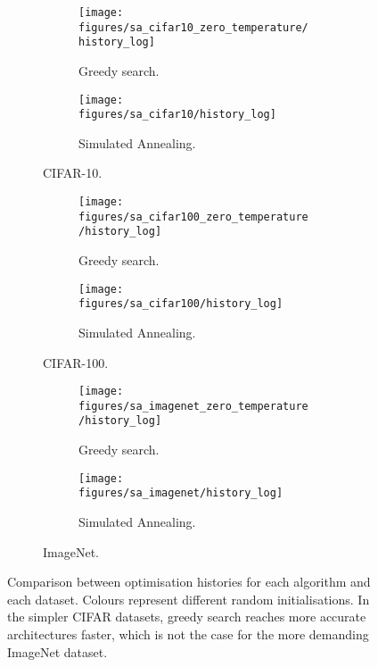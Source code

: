\documentclass{article}
\begin{document}
\begin{figure}[htbp]
    \begin{subfigure}[b]{\textwidth}
        \begin{subfigure}[b]{0.45\textwidth}
            \centering
            \texttt{[image: figures/sa\_cifar10\_zero\_temperature/history\_log]}
            \caption{Greedy search.}
        \end{subfigure}
        \hfill
        \begin{subfigure}[b]{0.45\textwidth}
            \centering
            \texttt{[image: figures/sa\_cifar10/history\_log]}
            \caption{Simulated Annealing.}
        \end{subfigure}
        \centering
        \caption*{CIFAR-10.}
    \end{subfigure}

    \begin{subfigure}[b]{\textwidth}
        \begin{subfigure}[b]{0.45\textwidth}
            \centering
            \texttt{[image: figures/sa\_cifar100\_zero\_temperature/history\_log]}
            \caption{Greedy search.}
        \end{subfigure}
        \hfill
        \begin{subfigure}[b]{0.45\textwidth}
            \centering
            \texttt{[image: figures/sa\_cifar100/history\_log]}
            \caption{Simulated Annealing.}
        \end{subfigure}
        \centering
        \caption*{CIFAR-100.}
    \end{subfigure}

    \begin{subfigure}[b]{\textwidth}
        \begin{subfigure}[b]{0.45\textwidth}
            \centering
            \texttt{[image: figures/sa\_imagenet\_zero\_temperature/history\_log]}
            \caption{Greedy search.}
        \end{subfigure}
        \hfill
        \begin{subfigure}[b]{0.45\textwidth}
            \centering
            \texttt{[image: figures/sa\_imagenet/history\_log]}
            \caption{Simulated Annealing.}
        \end{subfigure}
        \centering
        \caption*{ImageNet.}
    \end{subfigure}
    \caption{
        Comparison between optimisation histories for each algorithm
        and each dataset. Colours represent different random
        initialisations.
        In the simpler CIFAR datasets, greedy search
        reaches more accurate architectures faster, which is not the
        case for the more demanding ImageNet dataset.
    }
    \label{fig:history}
\end{figure}





\end{document}
